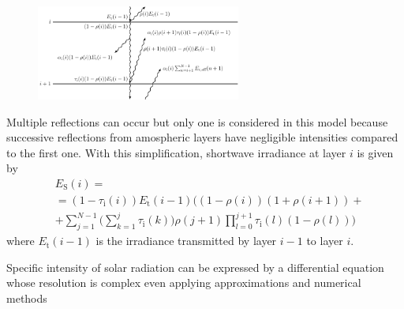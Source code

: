 \documentclass[a4paper,10pt,twocolumn,\classoptions]{article}
\begin{document}

\begin{figure}[h]
  \centering
  \includegraphics*[keepaspectratio=true,width=0.6\textwidth]{shortwave_radiation}
  \caption{} %
  \label{fig:shortwave_radiation}
\end{figure}
Multiple reflections can occur but only one is considered in this model because successive reflections from amospheric layers have negligible intensities compared to the first one.
With this simplification, shortwave irradiance at layer $i$ is given by
\begin{equation}
  \label{eq:irradiance_shortwave}
  \begin{split}
    & E_\text{S}(i) = \\
    & = (1 - \tau_\text{i}(i)) E_\text{t}(i - 1) \Bigg( (1 - \rho(i)) (1 + \rho(i + 1)) + \\
    & + \sum_{j = 1}^{N - 1} \bigg( \sum_{k = 1}^{j} \tau_\text{i}(k) \bigg) \rho(j + 1) \prod_{l = 0}^{j + 1} \tau_\text{i}(l) (1 - \rho(l)) \Bigg)
  \end{split}
\end{equation}
where $E_\text{t}(i - 1)$ is the irradiance transmitted by layer $i - 1$ to layer $i$.



Specific intensity of solar radiation can be expressed by a differential equation whose resolution is complex even applying approximations and numerical methods
\end{document}
